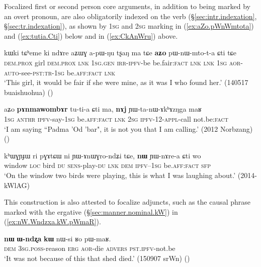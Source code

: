 Focalized first or second person core arguments, in addition to being marked by an overt pronoun, are also obligatorily indexed on the verb (§\ref{sec:intr.indexation}, §\ref{sec:tr.indexation}), as shown by \textsc{1sg} and \textsc{2sg} marking in (\ref{ex:aZo.pWnWmtota}) and (\ref{ex:tutia.Cti}) below and in (\ref{ex:CkAnWru}) above.

\begin{exe}
\ex \label{ex:aZo.pWnWmtota}
\gll  kɯki tɕʰeme ki ndɤre aʑɯɣ a-pɯ-ŋu tʂaŋ ma tɕe \textbf{aʑo} pɯ-nɯ-mto-t-a ɕti tɕe \\
\textsc{dem}.\textsc{prox} girl  \textsc{dem}.\textsc{prox} \textsc{lnk} \textsc{1sg}.\textsc{gen} \textsc{irr}-\textsc{ipfv}-be be.fair:\textsc{fact} \textsc{lnk} \textsc{lnk} \textsc{1sg} \textsc{aor}-\textsc{auto}-see-\textsc{pst}:\textsc{tr}-\textsc{1sg} be.\textsc{aff}:\textsc{fact} \textsc{lnk} \\
\glt `This girl, it would be fair if she were mine, as it was I who found her.' (140517 buaishuohua)
()
\end{exe}

\begin{exe}
\ex \label{ex:tutia.Cti}
\gll aʑo \textbf{pɤnmawombɤr} tu-ti-a ɕti ma, \textbf{nɤj} ɲɯ-ta-nɯ-ɤkʰɤzŋga maʁ  \\
\textsc{1sg}  \textsc{anthr} \textsc{ipfv}-say-\textsc{1sg} be.\textsc{aff}:\textsc{fact} \textsc{lnk} \textsc{2sg} \textsc{ipfv}-1\fl{}2-\textsc{appl}-call not.be:\textsc{fact} \\
\glt `I am saying ``Padma 'Od 'bar", it is not you that I am calling.' (2012 Norbzang)
()
\end{exe}

 \begin{exe}
\ex \label{ex:nW.YWnArea}
\gll  kʰɯɣɲɟɯ ri pɣɤtɕɯ ni ɲɯ-ɤnɯɣro-ndʑi tɕe, \textbf{nɯ} ɲɯ-nɤre-a ɕti wo  \\
window \textsc{loc} bird \textsc{du} \textsc{sens}-play-\textsc{du} \textsc{lnk} \textsc{dem} \textsc{ipfv}--\textsc{1sg}  be.\textsc{aff}:\textsc{fact} \textsc{sfp} \\
\glt `On the window two birds were playing, this is what I was laughing about.' (2014-kWlAG)
\end{exe}

This construction is also attested to focalize adjuncts, such as the causal phrase marked with the ergative (§\ref{sec:manner.nominal.kW}) in (\ref{ex:nW.Wndzxa.kW.pWmaR}).

\begin{exe}
\ex \label{ex:nW.Wndzxa.kW.pWmaR}
\gll  \textbf{nɯ} \textbf{ɯ-ndʐa} \textbf{kɯ} nɯ-si ʁo pɯ-maʁ. \\
\textsc{dem} \textsc{3sg}.\textsc{poss}-reason \textsc{erg} \textsc{aor}-die \textsc{advers} \textsc{pst}.\textsc{ipfv}-not.be \\
\glt `It was not because of this that shed died.' (150907 srWn)
()
\end{exe}


